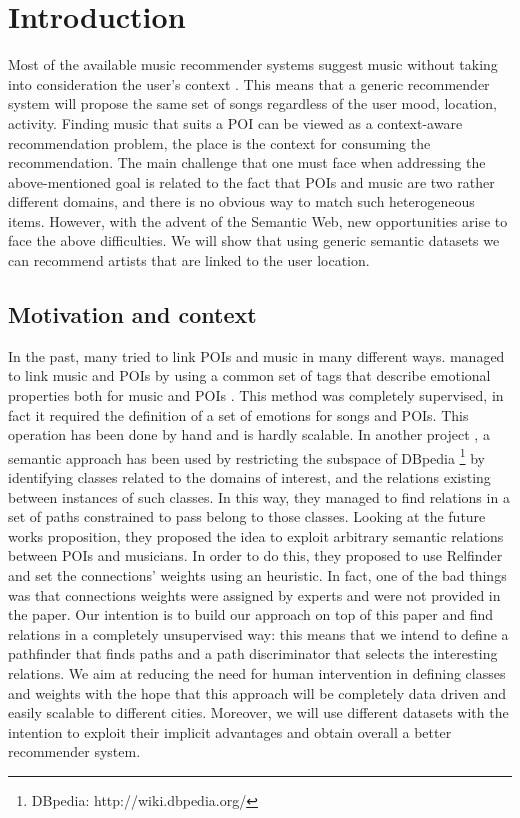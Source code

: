 \documentclass[paper=a4, fontsize=11pt]{scrartcl}
\begin{document}
\tableofcontents
\newpage

\section{Introduction}
Most of the available music recommender systems suggest music without taking into consideration the user’s context \cite{Knees:2013:SMS:2559928.2542206}. This means that a generic recommender system will propose the same set of songs regardless of the user mood, location, activity.
Finding music that suits a POI can be viewed as a context-aware recommendation problem, the place is the context for consuming the recommendation.                    
The main challenge that one must face when addressing the above-mentioned goal is related to the fact that POIs and music are two rather different domains, and there is no obvious way to match such heterogeneous items. However, with the advent of the Semantic Web, new opportunities arise to face the above difficulties. We will show that using generic semantic datasets we can recommend artists that are linked to the user location.

\subsection{Motivation and context}
In the past, many tried to link POIs and music in many different ways. managed to link music and POIs by using a common set of tags that describe emotional properties both for music and POIs \cite{Kaminskas:2013:LMR:2507157.2507180}.
This method was completely supervised, in fact it required the definition of a set of emotions for songs and POIs. This operation has been done by hand and is hardly scalable.
In another project \cite{Kaminskas:2012:KMR:2390848.2390854}, a semantic approach has been used by restricting the subspace of DBpedia \footnote{DBpedia: http://wiki.dbpedia.org/} by identifying classes related to the domains of interest, and the relations existing between instances of such classes. In this way, they managed to find relations in a set of paths constrained to pass belong to those classes. Looking at the future works proposition, they proposed the idea to exploit arbitrary semantic relations between POIs and musicians.
In order to do this, they proposed to use Relfinder \cite{Heim:2009:RRR:1695324.1695351} and set the connections' weights using an heuristic.  In fact, one of the bad things was that connections weights were assigned by experts and were not provided in the paper.
Our intention is to build our approach on top of this paper and find relations in a completely unsupervised way: this means that we intend to define a pathfinder that finds paths and a path discriminator that selects the interesting relations. We aim at reducing the need for human intervention in defining classes and weights with the hope that this approach will be completely data driven and easily scalable to different cities. Moreover, we will use different datasets with the intention to exploit their implicit advantages and obtain overall a better recommender system.
\end{document}
